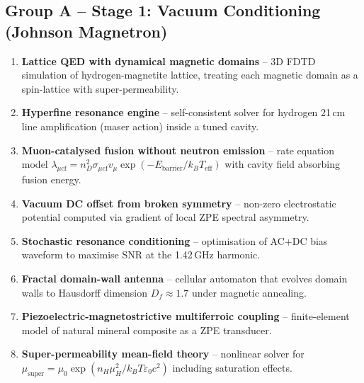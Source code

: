 \documentclass[11pt]{article}
\begin{document}
\subsection{Group A -- Stage 1: Vacuum Conditioning (Johnson Magnetron)}
\begin{enumerate}[nosep]
    \item \textbf{Lattice QED with dynamical magnetic domains} -- 3D FDTD simulation of hydrogen-magnetite lattice, treating each magnetic domain as a spin-lattice with super-permeability.
    \item \textbf{Hyperfine resonance engine} -- self-consistent solver for hydrogen 21\,cm line amplification (maser action) inside a tuned cavity.
    \item \textbf{Muon-catalysed fusion without neutron emission} -- rate equation model $\lambda_{\mu\text{cf}} = n_D^2\sigma_{\mu\text{cf}}v_\mu\exp(-E_{\text{barrier}}/k_B T_{\text{eff}})$ with cavity field absorbing fusion energy.
    \item \textbf{Vacuum DC offset from broken symmetry} -- non-zero electrostatic potential computed via gradient of local ZPE spectral asymmetry.
    \item \textbf{Stochastic resonance conditioning} -- optimisation of AC+DC bias waveform to maximise SNR at the 1.42\,GHz harmonic.
    \item \textbf{Fractal domain-wall antenna} -- cellular automaton that evolves domain walls to Hausdorff dimension $D_f\approx 1.7$ under magnetic annealing.
    \item \textbf{Piezoelectric-magnetostrictive multiferroic coupling} -- finite-element model of natural mineral composite as a ZPE transducer.
    \item \textbf{Super-permeability mean-field theory} -- nonlinear solver for $\mu_{\text{super}} = \mu_0\exp(n_H\mu_H^2/k_B T\varepsilon_0 c^2)$ including saturation effects.
\end{enumerate}
\end{document}
